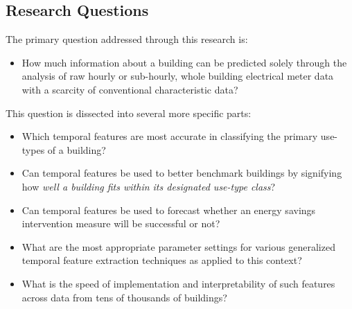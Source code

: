 \subsection{Research Questions}
The primary question addressed through this research is:
\begin{itemize}
\item How much information about a building can be predicted solely through the analysis of raw hourly or sub-hourly, whole building electrical meter data with a scarcity of conventional characteristic data? 
\end{itemize}
This question is dissected into several more specific parts:
\begin{itemize}
\item Which temporal features are most accurate in classifying the primary use-types of a building?
\item Can temporal features be used to better benchmark buildings by signifying how \emph{well a building fits within its designated use-type class}?
\item Can temporal features be used to forecast whether an energy savings intervention measure will be successful or not?
\item What are the most appropriate parameter settings for various generalized temporal feature extraction techniques as applied to this context?
\item What is the speed of implementation and interpretability of such features across data from tens of thousands of buildings?
\end{itemize}






